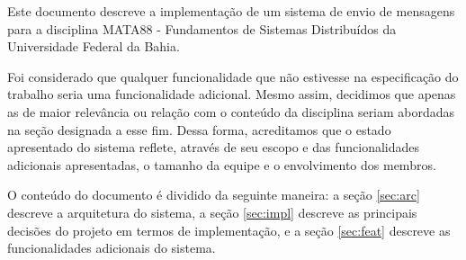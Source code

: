 \documentclass[../main.tex]{subfiles}
\begin{document}
Este documento descreve a implementação de um sistema de envio de mensagens para a disciplina MATA88 - Fundamentos de Sistemas Distribuídos da Universidade Federal da Bahia.

Foi considerado que qualquer funcionalidade que não estivesse na especificação do trabalho seria uma funcionalidade adicional.
Mesmo assim, decidimos que apenas as de maior relevância ou relação com o conteúdo da disciplina seriam abordadas na seção designada a esse fim.
Dessa forma, acreditamos que o estado apresentado do sistema reflete, através de seu escopo e das funcionalidades adicionais apresentadas, o tamanho da equipe e o envolvimento dos membros.

O conteúdo do documento é dividido da seguinte maneira: a seção \ref{sec:arc} descreve a arquitetura do sistema, a seção \ref{sec:impl} descreve as principais decisões do projeto em termos de implementação, e a seção \ref{sec:feat} descreve as funcionalidades adicionais do sistema.
\end{document}
